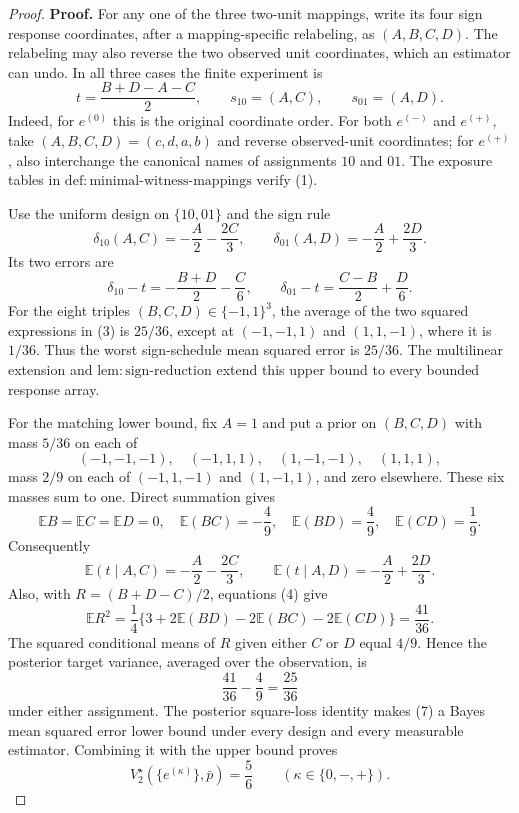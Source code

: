 \documentclass{article}
\begin{document}
\begin{proof}
\textbf{Proof.}
For any one of the three two-unit mappings, write its four sign response coordinates, after a mapping-specific relabeling, as \((A,B,C,D)\). The relabeling may also reverse the two observed unit coordinates, which an estimator can undo. In all three cases the finite experiment is
\[
 t=\frac{B+D-A-C}{2},\qquad
 s_{10}=(A,C),\qquad s_{01}=(A,D). \tag{1}
\]
Indeed, for \(e^{(0)}\) this is the original coordinate order. For both \(e^{(-)}\) and \(e^{(+)}\), take \((A,B,C,D)=(c,d,a,b)\) and reverse observed-unit coordinates; for \(e^{(+)}\), also interchange the canonical names of assignments \(10\) and \(01\). The exposure tables in \(\mathrm{def{:}minimal\text{-}witness\text{-}mappings}\) verify (1).

Use the uniform design on \(\{10,01\}\) and the sign rule
\[
 \delta_{10}(A,C)=-\frac A2-\frac{2C}{3},
 \qquad
 \delta_{01}(A,D)=-\frac A2+\frac{2D}{3}. \tag{2}
\]
Its two errors are
\[
 \delta_{10}-t=-\frac{B+D}{2}-\frac C6,
 \qquad
 \delta_{01}-t=\frac{C-B}{2}+\frac D6. \tag{3}
\]
For the eight triples \((B,C,D)\in\{-1,1\}^3\), the average of the two squared expressions in (3) is \(25/36\), except at \((-1,-1,1)\) and \((1,1,-1)\), where it is \(1/36\). Thus the worst sign-schedule mean squared error is \(25/36\). The multilinear extension and \(\mathrm{lem{:}sign\text{-}reduction}\) extend this upper bound to every bounded response array.

For the matching lower bound, fix \(A=1\) and put a prior on \((B,C,D)\) with mass \(5/36\) on each of
\[
 (-1,-1,-1),\quad(-1,1,1),\quad(1,-1,-1),\quad(1,1,1),
\]
mass \(2/9\) on each of \((-1,1,-1)\) and \((1,-1,1)\), and zero elsewhere. These six masses sum to one. Direct summation gives
\[
 \mathbb E B=\mathbb E C=\mathbb E D=0,
 \quad
 \mathbb E(BC)=-\frac49,
 \quad
 \mathbb E(BD)=\frac49,
 \quad
 \mathbb E(CD)=\frac19. \tag{4}
\]
Consequently
\[
 \mathbb E(t\mid A,C)=-\frac A2-\frac{2C}{3},
 \qquad
 \mathbb E(t\mid A,D)=-\frac A2+\frac{2D}{3}. \tag{5}
\]
Also, with \(R=(B+D-C)/2\), equations (4) give
\[
 \mathbb E R^2
 =\frac14\{3+2\mathbb E(BD)-2\mathbb E(BC)-2\mathbb E(CD)\}
 =\frac{41}{36}. \tag{6}
\]
The squared conditional means of \(R\) given either \(C\) or \(D\) equal \(4/9\). Hence the posterior target variance, averaged over the observation, is
\[
 \frac{41}{36}-\frac49=\frac{25}{36} \tag{7}
\]
under either assignment. The posterior square-loss identity makes (7) a Bayes mean squared error lower bound under every design and every measurable estimator. Combining it with the upper bound proves
\[
 V_2^\star(\{e^{(\kappa)}\},\bar p)=\frac56
 \qquad(\kappa\in\{0,-,+\}). \tag{8}
\]


\end{proof}
\end{document}

